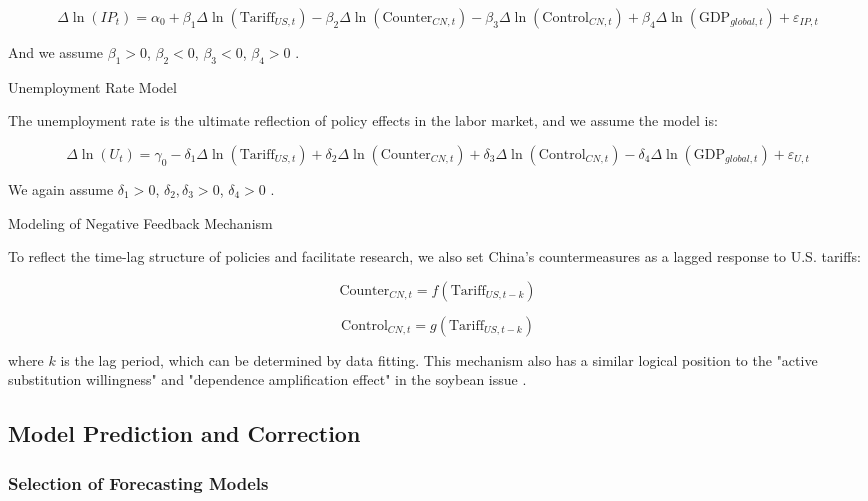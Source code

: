 \documentclass{apmcmthesis}
\begin{document}
\begin{equation}
\Delta \ln(IP_t) = \alpha_0 + 
\beta_1 \Delta \ln(\text{Tariff}_{US,t})
- \beta_2 \Delta \ln(\text{Counter}_{CN,t})
- \beta_3 \Delta \ln(\text{Control}_{CN,t})
+ \beta_4 \Delta \ln(\text{GDP}_{global,t})
+ \varepsilon_{IP,t}
\end{equation}

And we assume $\beta_1>0$, $\beta_2<0$, $\beta_3<0$, $\beta_4>0$ .

\item[Unemployment Rate Model]

The unemployment rate is the ultimate reflection of policy effects in the labor market, and we assume the model is:

\begin{equation}
\Delta \ln(U_t) = \gamma_0 
- \delta_1 \Delta \ln(\text{Tariff}_{US,t})
+ \delta_2 \Delta \ln(\text{Counter}_{CN,t})
+ \delta_3 \Delta \ln(\text{Control}_{CN,t})
- \delta_4 \Delta \ln(\text{GDP}_{global,t})
+ \varepsilon_{U,t}
\end{equation}

We again assume $\delta_1>0$, $\delta_2,\delta_3>0$, $\delta_4>0$ .

\item[Modeling of Negative Feedback Mechanism]

To reflect the time-lag structure of policies and facilitate research, we also set China's countermeasures as a lagged response to U.S. tariffs:

\begin{equation}
\text{Counter}_{CN,t} = f(\text{Tariff}_{US,t-k})
\end{equation}

\begin{equation}
\text{Control}_{CN,t} = g(\text{Tariff}_{US,t-k})
\end{equation}

where $k$ is the lag period, which can be determined by data fitting. This mechanism also has a similar logical position to the "active substitution willingness" and "dependence amplification effect" in the soybean issue \cite{hudsonbay2025guide}.

\subsection{Model Prediction and Correction}

\subsubsection{Selection of Forecasting Models}
\end{document}
